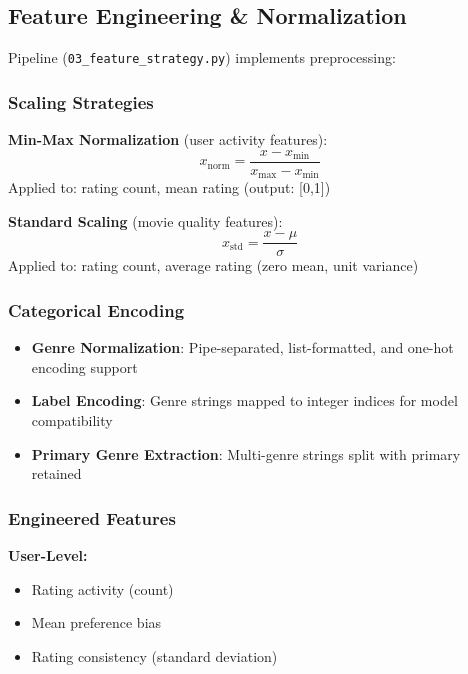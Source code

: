 \documentclass[11pt,a4paper]{article}
\begin{document}
\subsection{Feature Engineering \& Normalization}

Pipeline (\texttt{03\_feature\_strategy.py}) implements preprocessing:

\subsubsection{Scaling Strategies}

\textbf{Min-Max Normalization} (user activity features):
\begin{equation}
    x_{\text{norm}} = \frac{x - x_{\min}}{x_{\max} - x_{\min}}
\end{equation}
Applied to: rating count, mean rating (output: [0,1])

\textbf{Standard Scaling} (movie quality features):
\begin{equation}
    x_{\text{std}} = \frac{x - \mu}{\sigma}
\end{equation}
Applied to: rating count, average rating (zero mean, unit variance)

\subsubsection{Categorical Encoding}

\begin{itemize}
    \item \textbf{Genre Normalization}: Pipe-separated, list-formatted, and one-hot encoding support
    \item \textbf{Label Encoding}: Genre strings mapped to integer indices for model compatibility
    \item \textbf{Primary Genre Extraction}: Multi-genre strings split with primary retained
\end{itemize}

\subsubsection{Engineered Features}

\textbf{User-Level:}
\begin{itemize}
    \item Rating activity (count)
    \item Mean preference bias
    \item Rating consistency (standard deviation)
\end{itemize}
\end{document}
